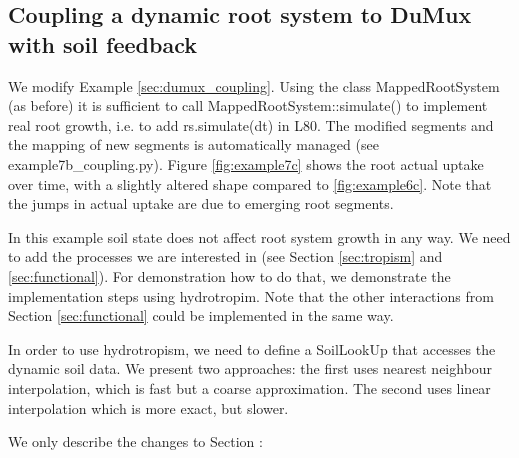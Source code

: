 \subsection{Coupling a dynamic root system to DuMux with soil feedback} \label{sec:dumux_dyn_coupling}

We modify Example \ref{sec:dumux_coupling}. Using the class MappedRootSystem (as before) it is sufficient to call MappedRootSystem::simulate() to implement real root growth, i.e. to add rs.simulate(dt) in L80. The modified segments and the mapping of new segments is automatically managed (see example7b\_coupling.py). Figure \ref{fig:example7c} shows the root actual uptake over time, with a slightly altered shape compared to \ref{fig:example6c}. Note that the jumps in actual uptake are due to emerging root segments.

In this example soil state does not affect root system growth in any way. We need to add the processes we are interested in (see Section \ref{sec:tropism} and \ref{sec:functional}). For demonstration how to do that, we demonstrate the implementation steps using hydrotropim. Note that the other interactions from Section \ref{sec:functional} could be implemented in the same way. 

In order to use hydrotropism, we need to define a SoilLookUp that accesses the dynamic soil data. We present two approaches: the first uses nearest neighbour interpolation, which is fast but a coarse approximation. The second uses linear interpolation which is more exact, but slower. 



We only describe the changes to Section \label{sec:dumux_coupling}:

